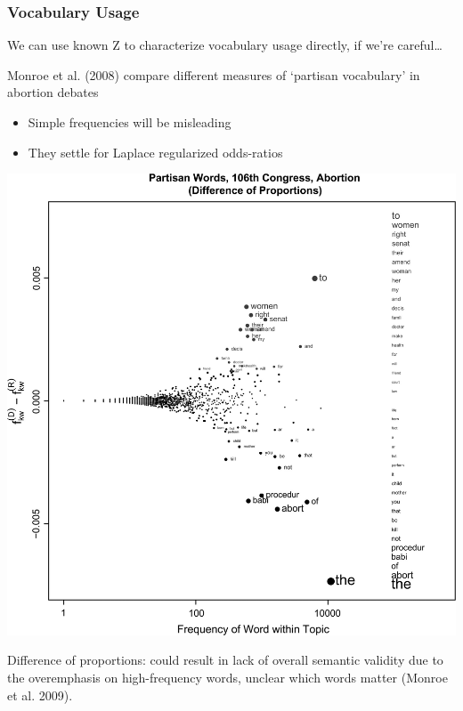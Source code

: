 \documentclass[11pt,compress,professionalfonts]{beamer}
\newcommand{\ita}{\begin{itemize}}
\newcommand{\itm}{\item[]}
\newcommand{\itz}{\end{itemize}}
\begin{document}
\begin{frame}[t,fragile]\frametitle{Vocabulary Usage}

We can use known Z to characterize vocabulary usage directly, if we're careful\ldots

Monroe et al. (2008) compare different measures of `partisan vocabulary' in abortion debates
\ita
\itm Simple frequencies will be misleading
\itm They settle for Laplace regularized odds-ratios
\itz

\newpage


\centerline{\includegraphics[scale=.1]{pictures/fightin0}}

{\footnotesize Difference of proportions: could result in lack of overall semantic validity due to the overemphasis on high-frequency words, unclear which words matter (Monroe et al. 2009).}


\end{frame}
\end{document}
